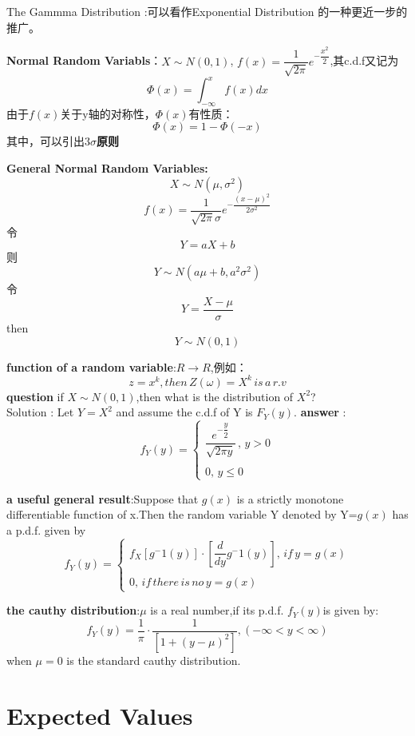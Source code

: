 \documentclass[12pt,a4paper]{ctexart}
\begin{document}
The Gammma Distribution :可以看作Exponential Distribution 的一种更近一步的推广。

\textbf{Normal Random Variabls}：$ X \sim N\left( 0,1\right)  $,
$f(x)= \dfrac {1}{\sqrt {2\pi }}e^{-\dfrac {x^{2}}{2}} $,其c.d.f又记为\[ \Phi \left(x \right) =\int_{-\infty}^{x} f \left(x \right) dx\]
由于$ f(x) $关于y轴的对称性，$ \Phi \left(x\right) $有性质：
\[ \Phi \left(x\right)=1-\Phi \left(-x\right) \]
其中，可以引出\textbf{$ 3 \sigma $原则}

\textbf{General Normal Random Variables:}
\[ X \sim N \left(\mu,\sigma ^2\right) \]
\[ f\left(x\right) =\dfrac{1}{\sqrt{2 \pi} \sigma} e^{-\dfrac{\left(x-\mu\right)^2}{2 \sigma ^2}}\]
令\[ Y=a X+b \] 则
\[ Y \sim N \left(a\mu+b,a^2 \sigma ^2\right) \]
令\[ Y=\dfrac{X-\mu}{\sigma} \]
then \[ Y \sim N \left(0,1\right) \]

\textbf{function of a random variable}:$ R \rightarrow R $,例如：
\[ z=x^k,then \, Z \left(\omega\right)= X^k \, is \, a \, r.v\]
\textbf{question } if $ X \sim N \left(0,1\right) $,then what is the distribution of $ X^2 $?\\
Solution : Let $ Y=X^2 $ and assume the c.d.f of Y is $ F_Y \left(y\right) $.
\textbf{answer }:
\[ f_Y \left(y\right)=\begin{cases}
\dfrac{e^{-\dfrac{y}{2}}}{\sqrt{2 \pi y}}  \, , \, y>0\\\\

0,\,y \leq 0
\end{cases} \]

\textbf{a useful general result}:Suppose that $ g \left(x\right) $ is a strictly monotone differentiable function of x.Then the random variable Y denoted by Y=$ g \left(x\right) $ has a p.d.f. given by
\[  f_{Y} \left(y\right) =\begin{cases}
f_X \left[g^-1 \left(y\right)\right] \cdot   \left[\dfrac{d}{dy} g^-1 \left(y\right)\right],\, if \, y=g\left(x\right)\\
\\
0,\,if \,there \,is \, no \,y=g \left(x\right)
\end{cases}\]

\textbf{the cauthy distribution}:$ \mu $ is a real number,if its p.d.f. $ f_Y \left(y\right) $is given by:
\[ f_Y \left(y\right)=\dfrac{1}{\pi} \cdot \dfrac{1}{\left[1+\left(y-\mu\right)^2\right]},\left(-\infty<y<\infty\right)\] 
when $ \mu =0 $ is the standard cauthy distribution.

\section{Expected Values}
\end{document}

